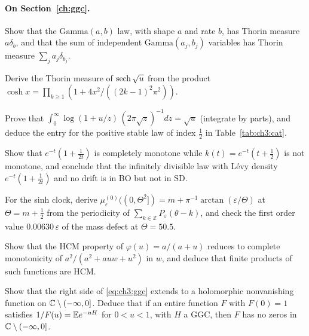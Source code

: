 \paragraph{On Section~\ref{ch:ggc}.}
\begin{exercises}
\item Show that the $\mathrm{Gamma}(a,b)$ law, with shape $a$ and rate $b$, has Thorin measure $a\delta_b$, and that the sum of independent $\mathrm{Gamma}(a_j,b_j)$ variables has Thorin measure $\sum_ja_j\delta_{b_j}$.
\item Derive the Thorin measure of $\operatorname{sech}\sqrt u$ from the product $\cosh x=\prod_{k\ge1}(1+4x^2/((2k-1)^2\pi^2))$.
\item Prove that $\int_0^\infty\log(1+u/z)\,(2\pi\sqrt z)^{-1}dz=\sqrt u$ (integrate by parts), and deduce the entry for the positive stable law of index $\frac12$ in Table~\ref{tab:ch3:cat}.
\item Show that $e^{-t}(1+\frac1{2t})$ is completely monotone while $k(t)=e^{-t}(t+\frac12)$ is not monotone, and conclude that the infinitely divisible law with L\'evy density $e^{-t}(1+\frac1{2t})$ and no drift is in BO but not in SD.
\item For the sinh clock, derive $\mu^{(0)}_\varepsilon((0,\Theta^2])=m+\pi^{-1}\arctan(\varepsilon/\Theta)$ at $\Theta=m+\frac12$ from the periodicity of $\sum_{k\in\mathbb Z}P_\varepsilon(\theta-k)$, and check the first order value $0.00630\,\varepsilon$ of the mass defect at $\Theta=50.5$.
\item Show that the HCM property of $\varphi(u)=a/(a+u)$ reduces to complete monotonicity of $a^2/(a^2+auw+u^2)$ in $w$, and deduce that finite products of such functions are HCM.
\item\label{ex:ch3:cont} Show that the right side of \eqref{eq:ch3:ggc} extends to a holomorphic nonvanishing function on $\mathbb{C}\setminus(-\infty,0]$. Deduce that if an entire function $F$ with $F(0)=1$ satisfies $1/F(u)=\mathbb{E} e^{-uH}$ for $0<u<1$, with $H$ a GGC, then $F$ has no zeros in $\mathbb{C}\setminus(-\infty,0]$.
\end{exercises}
